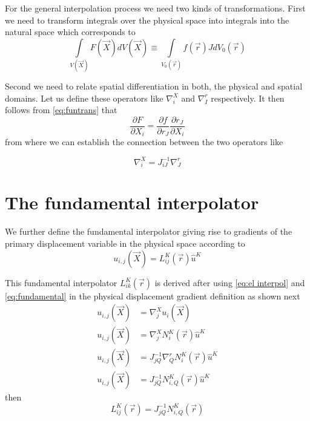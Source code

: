 For the general interpolation process we need two kinds of transformations.  First we need to transform integrals over the physical space into integrals into the natural space which corresponds to
\begin{equation}
\int\limits_{V(\vec{X})} F(\vec{X})dV(\vec{X})\equiv \int\limits_{V_0(\vec{r})} f(\vec{r})J dV_0(\vec{r})
\label{gen trans}
\end{equation}



Second we need to relate spatial differentiation in both, the physical and spatial domains.  Let us define these operators like $\nabla_i^X$ and $\nabla_I^r$ respectively. It then follows from \cref{eq:funtrans} that
\begin{equation}
\dfrac{\partial F}{\partial X_i}=\dfrac{\partial f}{\partial r_J}\dfrac{\partial r_J}{\partial X_i}
\label{eq:chain}
\end{equation}
from where we can establish the connection between the two operators like


\begin{equation}
\nabla_i^X=J_{iJ}^{-1}\nabla_J^r
\label{eq:fundamental}
\end{equation}


\section*{The fundamental interpolator}
We further define the fundamental interpolator giving rise to gradients of the primary displacement variable in the physical space according to
\begin{equation}
u_{i,j}(\vec{X})=L_{ij}^K(\vec{r})\hat{u}^K
\label{eq:fund operator}
\end{equation}


This fundamental interpolator  $L_{ik}^K(\vec{r})$ is derived after using \cref{eq:el interpol} and \cref{eq:fundamental} in the physical displacement gradient definition as shown next
\begin{align*}
u_{i,j}(\vec{X})&=\nabla_j^X u_i(\vec{X})\\
u_{i,j}(\vec{X})&=\nabla_j^X N_i^K(\vec{r})\hat{u}^K\\
u_{i,j}(\vec{X})&=J_{jQ}^{-1}\nabla_Q^r N_i^K(\vec{r})\hat{u}^K\\
u_{i,j}(\vec{X})&=J_{jQ}^{-1}N_{i,Q}^K(\vec{r})\hat{u}^K
\end{align*}
then
\begin{equation}
L_{ij}^K(\vec{r})=J_{jQ}^{-1}N_{i,Q}^K(\vec{r})
\label{eq:fundamental interpolator}
\end{equation}

